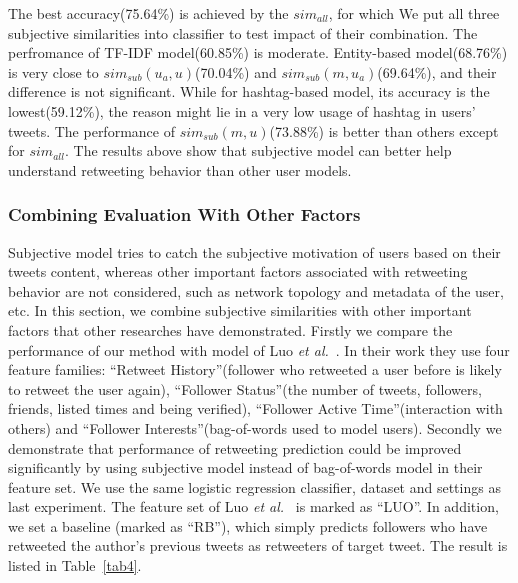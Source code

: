 \documentclass[letterpaper]{article}
\begin{document}
The best accuracy(75.64\%) is achieved by the $ sim_{all}  $, for which We put all three subjective similarities into classifier to test impact of their combination.
The perfromance of TF-IDF model(60.85\%) is moderate.  
Entity-based model(68.76\%) is very close to  $ sim_{sub}\left( u_{a},u \right)$(70.04\%) and $ sim_{sub}\left( m,u_{a} \right)  $(69.64\%), and their difference is not significant.
While for hashtag-based model, its accuracy is the lowest(59.12\%), the reason might lie in a very low usage of hashtag in users' tweets. 
The performance of $ sim_{sub} \left( m,u \right) $(73.88\%) is better than others except for $ sim_{all}  $.
The results above show that subjective model can better help understand retweeting behavior than other user models.

\subsubsection{Combining Evaluation With Other Factors}
\label{combining}
Subjective model tries to catch the subjective motivation of users based on their tweets content, whereas other important factors associated with retweeting behavior are not considered, such as network topology and metadata of the user, etc. 
In this section, we combine subjective similarities with other important factors that other researches have demonstrated. 
Firstly we compare the performance of our method with model of Luo \emph{et al.}~.
In their work they use four feature families: ``Retweet History''(follower who retweeted a user before is likely to retweet the user again), ``Follower Status''(the number of tweets, followers, friends, listed times and being verified), ``Follower Active Time''(interaction with others) and ``Follower Interests''(bag-of-words used to model users).
Secondly we demonstrate that performance of retweeting prediction could be improved significantly by using subjective model instead of bag-of-words model in their feature set. 
We use the same logistic regression classifier, dataset and settings as last experiment. The feature set of Luo \emph{et al.}~ is marked as ``LUO''.
In addition, we set a baseline (marked as ``RB''), which simply predicts followers who have retweeted the author's previous tweets as retweeters of target tweet. 
The result is listed in Table~\ref{tab4}.
\end{document}
